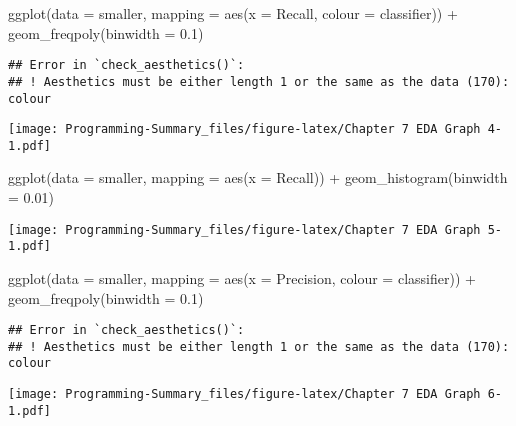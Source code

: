 \documentclass[
]{article}
\newenvironment{Shaded}{\begin{snugshade}}{\end{snugshade}}
\newcommand{\AttributeTok}[1]{\textcolor[rgb]{0.77,0.63,0.00}{#1}}
\newcommand{\FloatTok}[1]{\textcolor[rgb]{0.00,0.00,0.81}{#1}}
\newcommand{\FunctionTok}[1]{\textcolor[rgb]{0.00,0.00,0.00}{#1}}
\newcommand{\NormalTok}[1]{#1}
\newcommand{\SpecialCharTok}[1]{\textcolor[rgb]{0.00,0.00,0.00}{#1}}
\begin{document}
\begin{Shaded}
\begin{Highlighting}[]
\FunctionTok{ggplot}\NormalTok{(}\AttributeTok{data =}\NormalTok{ smaller, }\AttributeTok{mapping =} \FunctionTok{aes}\NormalTok{(}\AttributeTok{x =}\NormalTok{ Recall, }\AttributeTok{colour =}\NormalTok{ classifier)) }\SpecialCharTok{+}
  \FunctionTok{geom\_freqpoly}\NormalTok{(}\AttributeTok{binwidth =} \FloatTok{0.1}\NormalTok{)}
\end{Highlighting}
\end{Shaded}

\begin{verbatim}
## Error in `check_aesthetics()`:
## ! Aesthetics must be either length 1 or the same as the data (170): colour
\end{verbatim}

\texttt{[image: Programming-Summary\_files/figure-latex/Chapter 7 EDA Graph 4-1.pdf]}

\begin{Shaded}
\begin{Highlighting}[]
\FunctionTok{ggplot}\NormalTok{(}\AttributeTok{data =}\NormalTok{ smaller, }\AttributeTok{mapping =} \FunctionTok{aes}\NormalTok{(}\AttributeTok{x =}\NormalTok{ Recall)) }\SpecialCharTok{+}
  \FunctionTok{geom\_histogram}\NormalTok{(}\AttributeTok{binwidth =} \FloatTok{0.01}\NormalTok{)}
\end{Highlighting}
\end{Shaded}

\texttt{[image: Programming-Summary\_files/figure-latex/Chapter 7 EDA Graph 5-1.pdf]}

\begin{Shaded}
\begin{Highlighting}[]
\FunctionTok{ggplot}\NormalTok{(}\AttributeTok{data =}\NormalTok{ smaller, }\AttributeTok{mapping =} \FunctionTok{aes}\NormalTok{(}\AttributeTok{x =}\NormalTok{ Precision, }\AttributeTok{colour =}\NormalTok{ classifier)) }\SpecialCharTok{+}
  \FunctionTok{geom\_freqpoly}\NormalTok{(}\AttributeTok{binwidth =} \FloatTok{0.1}\NormalTok{)}
\end{Highlighting}
\end{Shaded}

\begin{verbatim}
## Error in `check_aesthetics()`:
## ! Aesthetics must be either length 1 or the same as the data (170): colour
\end{verbatim}

\texttt{[image: Programming-Summary\_files/figure-latex/Chapter 7 EDA Graph 6-1.pdf]}
\end{document}
